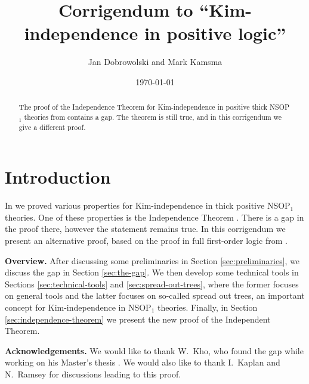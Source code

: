 \documentclass[a4paper, reqno]{amsart}
\title{Corrigendum to ``Kim-independence in positive logic''}
\author{Jan Dobrowolski and Mark Kamsma}
\date{\today}
\newcommand{\note}[1]{\textcolor{red}{#1}}
\theoremstyle{definition}
\theoremstyle{repeat}
\begin{document}
\begin{abstract}
The proof of the Independence Theorem for Kim-independence in positive thick NSOP$_1$ theories from \cite{dobrowolski_kim-independence_2022} contains a gap. The theorem is still true, and in this corrigendum we give a different proof.
\end{abstract}

\maketitle

\tableofcontents

\section{Introduction}
\label{sec:introduction}
In \cite{dobrowolski_kim-independence_2022} we proved various properties for Kim-independence in thick positive NSOP$_1$ theories. One of these properties is the Independence Theorem \cite[Theorem 7.7]{dobrowolski_kim-independence_2022}. There is a gap in the proof there, however the statement remains true. In this corrigendum we present an alternative proof, based on the proof in full first-order logic from \cite{kaplan_kim-independence_2020}.


\textbf{Overview.} After discussing some preliminaries in Section \ref{sec:preliminaries}, we discuss the gap in Section \ref{sec:the-gap}. We then develop some technical tools in Sections \ref{sec:technical-tools} and \ref{sec:spread-out-trees}, where the former focuses on general tools and the latter focuses on so-called spread out trees, an important concept for Kim-independence in NSOP$_1$ theories. Finally, in Section \ref{sec:independence-theorem} we present the new proof of the Independent Theorem.

\textbf{Acknowledgements.} We would like to thank W.\ Kho, who found the gap while working on his Master's thesis \cite{kho_primer_2023}. We would also like to thank I.\ Kaplan and N.\ Ramsey for discussions leading to this proof.
\end{document}
